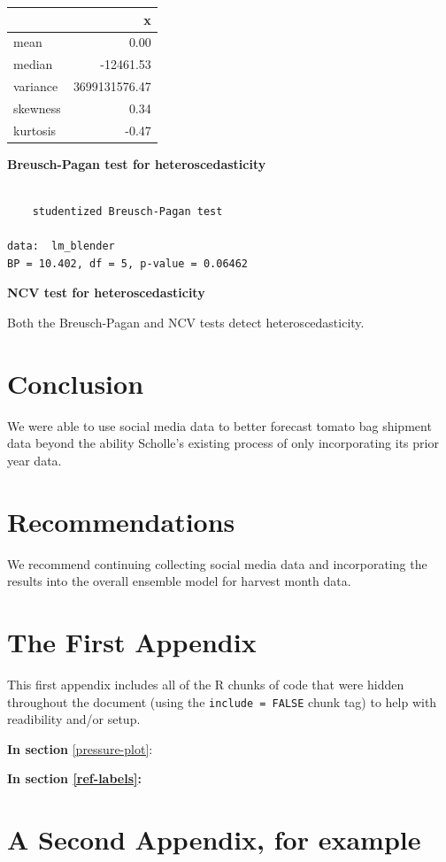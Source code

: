 \documentclass[12pt,oneside]{chicagocapstone}
\begin{document}
\begin{longtable}[]{@{}lr@{}}
\toprule
& x\tabularnewline
\midrule
\endhead
mean & 0.00\tabularnewline
median & -12461.53\tabularnewline
variance & 3699131576.47\tabularnewline
skewness & 0.34\tabularnewline
kurtosis & -0.47\tabularnewline
\bottomrule
\end{longtable}
\textbf{Breusch-Pagan test for heteroscedasticity}
\begin{verbatim}

    studentized Breusch-Pagan test

data:  lm_blender
BP = 10.402, df = 5, p-value = 0.06462
\end{verbatim}
\textbf{NCV test for heteroscedasticity}

Both the Breusch-Pagan and NCV tests detect heteroscedasticity.

\chapter*{Conclusion}\label{conclusion}

We were able to use social media data to better forecast tomato bag
shipment data beyond the ability Scholle's existing process of only
incorporating its prior year data.

\chapter*{Recommendations}\label{recommendations}

We recommend continuing collecting social media data and incorporating
the results into the overall ensemble model for harvest month data.

\appendix

\chapter{The First Appendix}\label{the-first-appendix}

This first appendix includes all of the R chunks of code that were
hidden throughout the document (using the \texttt{include\ =\ FALSE}
chunk tag) to help with readibility and/or setup.

\textbf{In section} \ref{pressure-plot}:

\textbf{In section \ref{ref-labels}:}

\chapter{A Second Appendix, for
example}\label{a-second-appendix-for-example}
\end{document}
